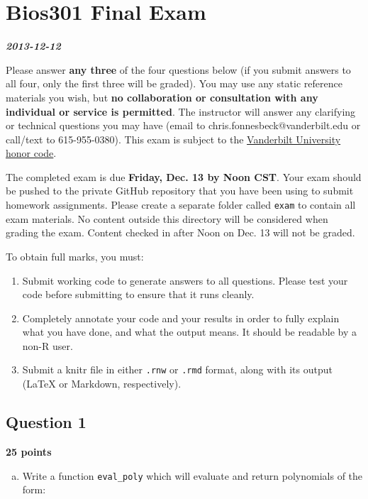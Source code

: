 \documentclass[]{article}
\author{}
\date{}
\begin{document}
\section{Bios301 Final Exam}

\textbf{\emph{2013-12-12}}

Please answer \textbf{any three} of the four questions below (if you
submit answers to all four, only the first three will be graded). You
may use any static reference materials you wish, but \textbf{no
collaboration or consultation with any individual or service is
permitted}. The instructor will answer any clarifying or technical
questions you may have (email to chris.fonnesbeck@vanderbilt.edu or
call/text to 615-955-0380). This exam is subject to the
\href{http://www.vanderbilt.edu/student\_handbook/the-honor-system\#honorcode}{Vanderbilt
University honor code}.

The completed exam is due \textbf{Friday, Dec. 13 by Noon CST}. Your
exam should be pushed to the private GitHub repository that you have
been using to submit homework assignments. Please create a separate
folder called \texttt{exam} to contain all exam materials. No content
outside this directory will be considered when grading the exam. Content
checked in after Noon on Dec. 13 will not be graded.

To obtain full marks, you must:

\begin{enumerate}[1.]
\item
  Submit working code to generate answers to all questions. Please test
  your code before submitting to ensure that it runs cleanly.
\item
  Completely annotate your code and your results in order to fully
  explain what you have done, and what the output means. It should be
  readable by a non-R user.
\item
  Submit a knitr file in either \texttt{.rnw} or \texttt{.rmd} format,
  along with its output (LaTeX or Markdown, respectively).
\end{enumerate}

\subsection{Question 1}

\textbf{25 points}

\begin{enumerate}[a.]
\item
  Write a function \texttt{eval\_poly} which will evaluate and return
  polynomials of the form:
\end{enumerate}
\end{document}
